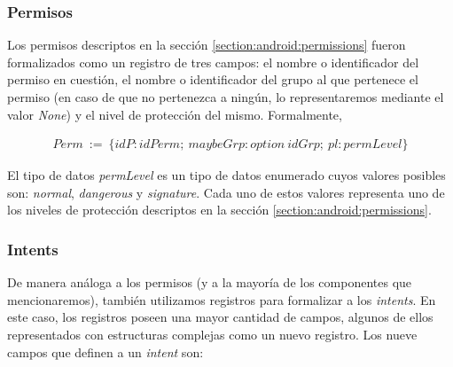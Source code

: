 

\subsubsection*{Permisos}
Los permisos descriptos en la sección \ref{section:android:permissions} fueron formalizados como un
registro de tres campos: el nombre o identificador del permiso en cuestión, el nombre o identificador del
grupo al que pertenece el permiso (en caso de que no pertenezca a ningún, lo representaremos mediante el
valor \textit{None}) y el nivel de protección del mismo. Formalmente,

\begin{align*}
    Perm\ :=\ \{ idP: idPerm;\ maybeGrp: option\ idGrp;\ pl: permLevel \}
\end{align*}

El tipo de datos \textit{permLevel} es un tipo de datos enumerado cuyos valores posibles son:
\textit{normal}, \textit{dangerous} y \textit{signature}. Cada uno de estos valores representa uno de los
niveles de protección descriptos en la sección \ref{section:android:permissions}.

\subsubsection*{Intents}
De manera análoga a los permisos (y a la mayoría de los componentes que mencionaremos), también
utilizamos registros para formalizar a los \textit{intents}. En este caso, los registros poseen una mayor
cantidad de campos, algunos de ellos representados con estructuras complejas como un nuevo registro. Los
nueve campos que definen a un \textit{intent} son:

